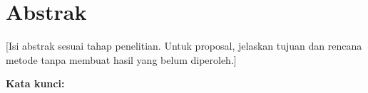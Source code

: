 \chapter*{Abstrak}
[Isi abstrak sesuai tahap penelitian. Untuk proposal, jelaskan tujuan dan rencana metode tanpa membuat hasil yang belum diperoleh.]

\par\medskip
\noindent\textbf{Kata kunci:} \ResearchKeywords

\clearpage
